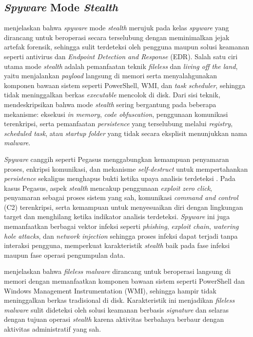 \subsection{\textit{Spyware} Mode \textit{Stealth}}

\textcite{elghaly2024fileless} menjelaskan bahwa \textit{spyware} mode 
\textit{stealth} merujuk pada kelas \textit{spyware} yang dirancang untuk 
beroperasi secara terselubung dengan meminimalkan jejak artefak forensik, sehingga 
sulit terdeteksi oleh pengguna maupun solusi keamanan seperti antivirus 
dan \textit{Endpoint Detection and Response} (EDR). Salah satu ciri 
utama mode \textit{stealth} adalah pemanfaatan teknik \textit{fileless} 
dan \textit{living off the land}, yaitu menjalankan \textit{payload} 
langsung di memori serta menyalahgunakan komponen bawaan sistem seperti 
PowerShell, WMI, dan \textit{task scheduler}, sehingga tidak meninggalkan 
berkas \textit{executable} mencolok di disk. Dari sisi teknik, 
\autocite{elghaly2024fileless} mendeskripsikan bahwa mode \textit{stealth} sering 
bergantung pada beberapa mekanisme: eksekusi \textit{in memory}, 
\textit{code obfuscation}, penggunaan komunikasi terenkripsi, serta 
pemanfaatan \textit{persistence} yang terselubung melalui \textit{registry}, 
\textit{scheduled task}, atau \textit{startup folder} yang tidak secara 
eksplisit menunjukkan nama \textit{malware}.

\textit{Spyware} canggih seperti Pegasus menggabungkan kemampuan penyamaran 
proses, enkripsi komunikasi, dan mekanisme \textit{self-destruct} untuk 
mempertahankan \textit{persistence} sekaligus menghapus bukti ketika 
upaya analisis terdeteksi \autocite{kareem2024pegasus}. Pada kasus Pegasus, 
aspek \textit{stealth} mencakup penggunaan \textit{exploit zero click}, 
penyamaran sebagai proses sistem yang sah, komunikasi \textit{command and 
control} (C2) terenkripsi, serta kemampuan untuk menyesuaikan diri dengan 
lingkungan target dan menghilang ketika indikator analisis terdeteksi. 
\textit{Spyware} ini juga memanfaatkan berbagai vektor infeksi seperti 
\textit{phishing}, \textit{exploit chain}, \textit{watering hole attacks}, 
dan \textit{network injection} sehingga proses infeksi dapat terjadi tanpa 
interaksi pengguna, memperkuat karakteristik \textit{stealth} baik pada 
fase infeksi maupun fase operasi pengumpulan data.

\Textcite{sudhakar2020fileless} menjelaskan bahwa \textit{fileless malware} 
dirancang untuk beroperasi langsung di memori dengan memanfaatkan komponen 
bawaan sistem seperti PowerShell dan Windows Management Instrumentation 
(WMI), sehingga hampir tidak meninggalkan berkas tradisional di disk. 
Karakteristik ini menjadikan \textit{fileless malware} sulit dideteksi 
oleh solusi keamanan berbasis \textit{signature} dan selaras dengan tujuan 
operasi \textit{stealth} karena aktivitas berbahaya berbaur dengan aktivitas 
administratif yang sah.

